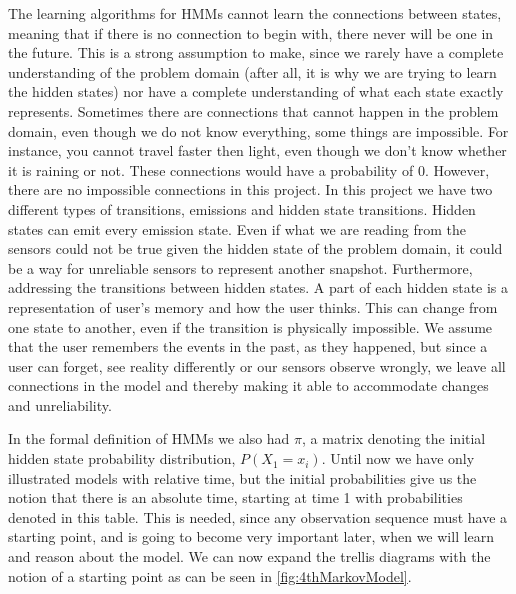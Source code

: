 The learning algorithms for HMMs cannot learn the connections between states, meaning that if there is no connection to begin with, there never will be one in the future. This is a strong assumption to make, since we rarely have a complete understanding of the problem domain (after all, it is why we are trying to learn the hidden states) nor have a complete understanding of what each state exactly represents. Sometimes there are connections that cannot happen in the problem domain, even though we do not know everything, some things are impossible. For instance, you cannot travel faster then light, even though we don't know whether it is raining or not. These connections would have a probability of $0$. However, there are no impossible connections in this project. In this project we have two different types of transitions, emissions and hidden state transitions. Hidden states can emit every emission state. Even if what we are reading from the sensors could not be true given the hidden state of the problem domain, it could be a way for unreliable sensors to represent another snapshot. Furthermore, addressing the transitions between hidden states. A part of each hidden state is a representation of user's memory and how the user thinks. This can change from one state to another, even if the transition is physically impossible. We assume that the user remembers the events in the past, as they happened, but since a user can forget, see reality differently or our sensors observe wrongly, we leave all connections in the model and thereby making it able to accommodate changes and unreliability.

In the formal definition of HMMs we also had $\pi$, a matrix denoting the initial hidden state probability distribution, $P(X_1=x_i)$. Until now we have only illustrated models with relative time, but the initial probabilities give us the notion that there is an absolute time, starting at time 1 with probabilities denoted in this table. This is needed, since any observation sequence must have a starting point, and is going to become very important later, when we will learn and reason about the model. We can now expand the trellis diagrams with the notion of a starting point as can be seen in \cref{fig:4thMarkovModel}.

